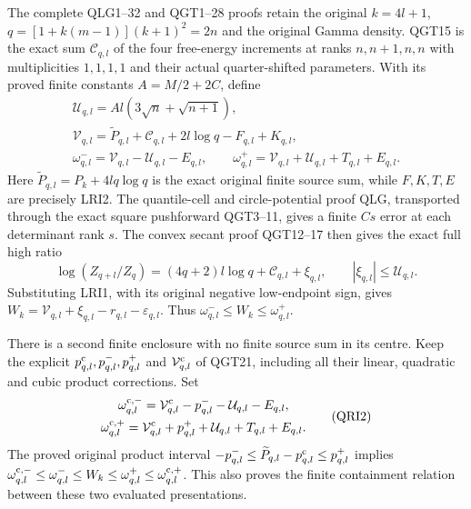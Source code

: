 \documentclass[11pt,a4paper]{article}
\begin{document}
The complete QLG1--32 and QGT1--28 proofs retain the original
$k=4l+1$, $q=[1+k(m-1)](k+1)^2=2n$ and the original Gamma
density. QGT15 is the exact sum $\mathcal C_{q,l}$ of the four
free-energy increments at ranks $n,n+1,n,n$ with multiplicities
$1,1,1,1$ and their actual quarter-shifted parameters. With its
proved finite constants $A=M/2+2C$, define
\[
\begin{gathered}
 \mathcal U_{q,l}=Al(3\sqrt n+\sqrt{n+1}),\\
 \mathcal V_{q,l}=\widetilde P_{q,l}+\mathcal C_{q,l}
                         +2l\log q-F_{q,l}+K_{q,l},\\
 \omega_{q,l}^-=\mathcal V_{q,l}-\mathcal U_{q,l}-E_{q,l},
 \qquad
 \omega_{q,l}^+=\mathcal V_{q,l}
                        +\mathcal U_{q,l}+T_{q,l}+E_{q,l}.
\end{gathered}\tag{QRI1}
\]
Here $\widetilde P_{q,l}=P_k+4lq\log q$ is the exact original
finite source sum, while $F,K,T,E$ are precisely LRI2. The
quantile-cell and circle-potential proof QLG, transported through
the exact square pushforward QGT3--11, gives a finite $Cs$ error
at each determinant rank $s$. The convex secant proof QGT12--17
then gives the exact full high ratio
\[
 \log(Z_{q+l}/Z_q)=(4q+2)l\log q+\mathcal C_{q,l}+\xi_{q,l},
 \qquad |\xi_{q,l}|\le\mathcal U_{q,l}.
\]
Substituting LRI1, with its original negative low-endpoint sign,
gives
$W_k=\mathcal V_{q,l}+\xi_{q,l}-r_{q,l}-\varepsilon_{q,l}$.
Thus $\omega_{q,l}^-\le W_k\le\omega_{q,l}^+$.

There is a second finite enclosure with no finite source sum in
its centre. Keep the explicit $p^{\rm c}_{q,l},p^-_{q,l},p^+_{q,l}$
and $\mathcal V^{\rm c}_{q,l}$ of QGT21, including all their
linear, quadratic and cubic product corrections. Set
\[
\begin{gathered}
 \omega_{q,l}^{\rm c,-}=\mathcal V^{\rm c}_{q,l}
                    -p^-_{q,l}-\mathcal U_{q,l}-E_{q,l},\\
 \omega_{q,l}^{\rm c,+}=\mathcal V^{\rm c}_{q,l}
                    +p^+_{q,l}+\mathcal U_{q,l}+T_{q,l}+E_{q,l}.
\end{gathered}\tag{QRI2}
\]
The proved original product interval
$-p^-_{q,l}\le\widetilde P_{q,l}-p^{\rm c}_{q,l}\le p^+_{q,l}$
implies
$\omega_{q,l}^{\rm c,-}\le\omega_{q,l}^-\le W_k
 \le\omega_{q,l}^+\le\omega_{q,l}^{\rm c,+}$.
This also proves the finite containment relation between these
two evaluated presentations.
\end{document}
